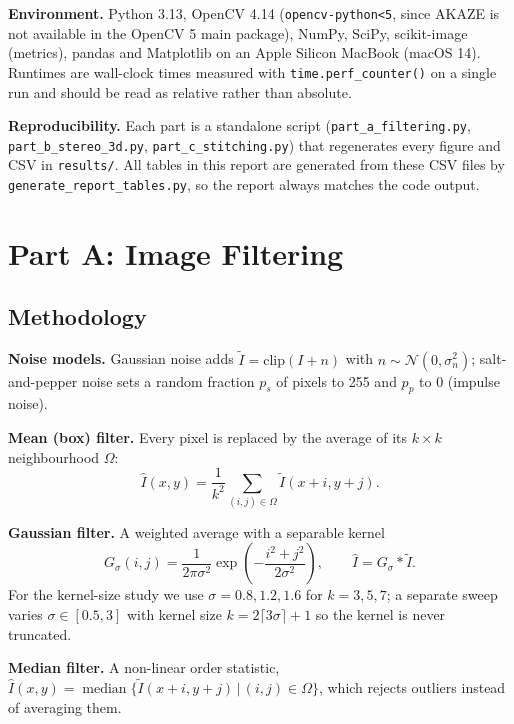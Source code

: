 \documentclass[a4paper,12pt]{article}
\begin{document}
\textbf{Environment.} Python 3.13, OpenCV 4.14 (\texttt{opencv-python<5}, since AKAZE is not
available in the OpenCV 5 main package), NumPy, SciPy, scikit-image (metrics), pandas and
Matplotlib on an Apple Silicon MacBook (macOS 14). Runtimes are wall-clock times measured with
\texttt{time.perf\_counter()} on a single run and should be read as relative rather than absolute.

\textbf{Reproducibility.} Each part is a standalone script (\texttt{part\_a\_filtering.py},
\texttt{part\_b\_stereo\_3d.py}, \texttt{part\_c\_stitching.py}) that regenerates every figure and CSV
in \texttt{results/}. All tables in this report are generated from these CSV files by
\texttt{generate\_report\_tables.py}, so the report always matches the code output.

\section{Part A: Image Filtering}\label{sec:parta}
\subsection{Methodology}

\textbf{Noise models.} Gaussian noise adds $\tilde I = \mathrm{clip}(I + n)$ with
$n\sim\mathcal N(0,\sigma_n^2)$; salt-and-pepper noise sets a random fraction $p_s$ of pixels to
255 and $p_p$ to 0 (impulse noise).

\textbf{Mean (box) filter.} Every pixel is replaced by the average of its $k\times k$ neighbourhood $\Omega$:
\begin{equation}
    \hat I(x,y) = \frac{1}{k^2}\sum_{(i,j)\in\Omega} \tilde I(x+i,y+j).
\end{equation}

\textbf{Gaussian filter.} A weighted average with a separable kernel
\begin{equation}
    G_\sigma(i,j) = \frac{1}{2\pi\sigma^2}\exp\!\left(-\frac{i^2+j^2}{2\sigma^2}\right),
    \qquad \hat I = G_\sigma * \tilde I .
\end{equation}
For the kernel-size study we use $\sigma=0.8,1.2,1.6$ for $k=3,5,7$; a separate sweep varies
$\sigma\in[0.5,3]$ with kernel size $k=2\lceil3\sigma\rceil+1$ so the kernel is never truncated.

\textbf{Median filter.} A non-linear order statistic,
$\hat I(x,y)=\operatorname{median}\{\tilde I(x+i,y+j)\,|\,(i,j)\in\Omega\}$, which rejects outliers
instead of averaging them.
\end{document}
